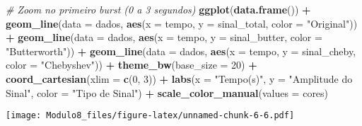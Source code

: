 \documentclass[
]{article}
\newenvironment{Shaded}{\begin{snugshade}}{\end{snugshade}}
\newcommand{\AttributeTok}[1]{\textcolor[rgb]{0.13,0.29,0.53}{#1}}
\newcommand{\CommentTok}[1]{\textcolor[rgb]{0.56,0.35,0.01}{\textit{#1}}}
\newcommand{\DecValTok}[1]{\textcolor[rgb]{0.00,0.00,0.81}{#1}}
\newcommand{\FunctionTok}[1]{\textcolor[rgb]{0.13,0.29,0.53}{\textbf{#1}}}
\newcommand{\NormalTok}[1]{#1}
\newcommand{\SpecialCharTok}[1]{\textcolor[rgb]{0.81,0.36,0.00}{\textbf{#1}}}
\newcommand{\StringTok}[1]{\textcolor[rgb]{0.31,0.60,0.02}{#1}}
\begin{document}
\begin{Shaded}
\begin{Highlighting}[]
\CommentTok{\# Zoom no primeiro burst (0 a 3 segundos)}
\FunctionTok{ggplot}\NormalTok{(}\FunctionTok{data.frame}\NormalTok{()) }\SpecialCharTok{+}
  \FunctionTok{geom\_line}\NormalTok{(}\AttributeTok{data =}\NormalTok{ dados, }\FunctionTok{aes}\NormalTok{(}\AttributeTok{x =}\NormalTok{ tempo, }\AttributeTok{y =}\NormalTok{ sinal\_total, }\AttributeTok{color =} \StringTok{"Original"}\NormalTok{)) }\SpecialCharTok{+}
  \FunctionTok{geom\_line}\NormalTok{(}\AttributeTok{data =}\NormalTok{ dados, }\FunctionTok{aes}\NormalTok{(}\AttributeTok{x =}\NormalTok{ tempo, }\AttributeTok{y =}\NormalTok{ sinal\_butter, }\AttributeTok{color =} \StringTok{"Butterworth"}\NormalTok{)) }\SpecialCharTok{+}
  \FunctionTok{geom\_line}\NormalTok{(}\AttributeTok{data =}\NormalTok{ dados, }\FunctionTok{aes}\NormalTok{(}\AttributeTok{x =}\NormalTok{ tempo, }\AttributeTok{y =}\NormalTok{ sinal\_cheby, }\AttributeTok{color =} \StringTok{"Chebyshev"}\NormalTok{)) }\SpecialCharTok{+}
  \FunctionTok{theme\_bw}\NormalTok{(}\AttributeTok{base\_size =} \DecValTok{20}\NormalTok{) }\SpecialCharTok{+}
  \FunctionTok{coord\_cartesian}\NormalTok{(}\AttributeTok{xlim =} \FunctionTok{c}\NormalTok{(}\DecValTok{0}\NormalTok{, }\DecValTok{3}\NormalTok{)) }\SpecialCharTok{+}
  \FunctionTok{labs}\NormalTok{(}\AttributeTok{x =} \StringTok{"Tempo(s)"}\NormalTok{, }\AttributeTok{y =} \StringTok{"Amplitude do Sinal"}\NormalTok{, }\AttributeTok{color =} \StringTok{"Tipo de Sinal"}\NormalTok{) }\SpecialCharTok{+}
  \FunctionTok{scale\_color\_manual}\NormalTok{(}\AttributeTok{values =}\NormalTok{ cores)}
\end{Highlighting}
\end{Shaded}

\texttt{[image: Modulo8\_files/figure-latex/unnamed-chunk-6-6.pdf]}
\end{document}
